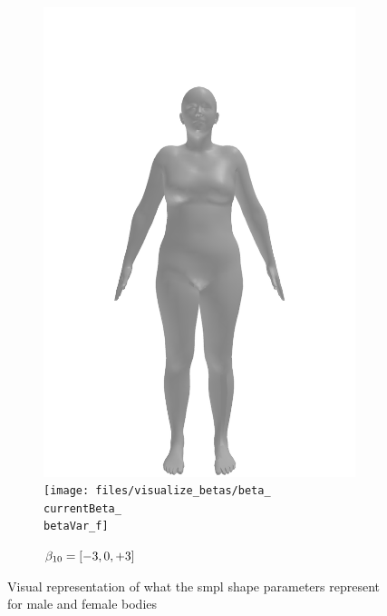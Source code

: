 \begin{figure}[ht!]
\begin{subfigure}{\betaWidth}
        \includegraphics[width=\imgWidth]{files/visualize_betas/baseline_f}
        \texttt{[image: files/visualize\_betas/beta\_\\currentBeta\_\\betaVar\_f]}
        \caption{$\beta_{10} = [-3, 0, +3]$}
    \end{subfigure}
    \caption{Visual representation of what the \gls{smpl} shape parameters represent for
        male and female bodies}\label{fig:beta-vis}
\end{figure}